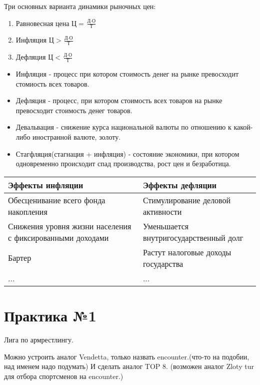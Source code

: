 \documentclass[a4paper, 12pt]{article}
\begin{document}
	Три основных варианта динамики рыночных цен:
	\begin{enumerate}
		\item Равновесная цена $\text{Ц} = \frac{\text{Д} \cdot \text{О}}{\text{Т}}$
		\item Инфляция $\text{Ц} > \frac{\text{Д} \cdot \text{О}}{\text{Т}}$
		\item Дефляция $\text{Ц} < \frac{\text{Д} \cdot \text{О}}{\text{Т}}$
	\end{enumerate}

	\begin{itemize}
		\item Инфляция - процесс при котором стоимость денег на рынке превосходит стомиость всех товаров.
		\item Дефляция - процесс, при котором стоимость всех товаров на рынке превосходит стоимость денег товаров.
		\item Девальвация  - снижение курса национальной валюты по отношению к какой-либо иностранной валюте, золоту.
		\item Стагфляция(стагнация + инфляция) - состояние экономики, при котором одновременно происходит спад производства, рост цен и безработица.
	\end{itemize}

	\begin{center}
		\begin{tabular}{ | m{10em} | m{10em} | }
			\hline
			Эффекты инфляции & Эффекты дефляции \\
			\hline
			Обесценивание всего фонда накопления & Стимулирование деловой активности \\
			\hline
			Снижения уровня жизни населения с фиксированными доходами & Уменьшается внутригосударственный долг \\
			\hline
			Бартер & Растут налоговые доходы государства \\
			\hline
			... & ... \\
			\hline
		\end{tabular}
	\end{center}
	
	\part*{Практика №1}
	
	Лига по армрестлингу. 
	
	Можно устроить аналог Vendetta, только назвать encounter.(что-то на подобии, над именем надо подумать) И сделать аналог TOP 8. (возможен аналог Zloty tur для отбора спортсменов на encounter.)
	
\end{document}

